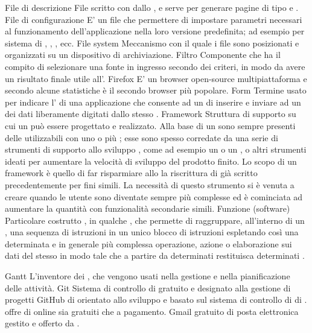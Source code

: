 \elemento
{File di descrizione}
{File scritto con   dallo , e serve per generare pagine di tipo e .}
\elemento
{File di configurazione}
{E' un file che permettere di impostare parametri necessari al funzionamento dell'applicazione nella loro versione predefinita; ad esempio  per sistema di , , , ecc.}
\elemento
{File system}
{Meccanismo con il quale i file sono posizionati e organizzati su un dispositivo di archiviazione.}
\elemento
{Filtro} 
{Componente che ha il compito di selezionare una fonte in ingresso secondo dei criteri, in modo da avere un risultato finale utile all'.}
\elemento
{Firefox}
{E' un browser open-source multipiattaforma e secondo alcune statistiche è il secondo browser più popolare.}
\elemento
{Form}
{Termine usato per indicare l' di una applicazione che consente ad un  di inserire e inviare ad un  dei dati liberamente digitati dallo stesso .}
\elemento
{Framework}
{Struttura di supporto su cui un  può essere progettato e realizzato. Alla base di un  sono sempre presenti delle  utilizzabili con uno o più ; esse sono spesso corredate da una serie di strumenti di supporto allo sviluppo , come ad esempio un  o un , o altri strumenti ideati per aumentare la velocità di sviluppo del prodotto finito.
Lo scopo di un framework è quello di far risparmiare allo la riscrittura di  già scritto precedentemente per fini simili. La necessità di questo strumento si è venuta a creare quando le  utente sono diventate sempre più complesse ed è cominciata ad aumentare la quantità  con funzionalità secondarie simili.}
\elemento
{Funzione (software)}
{Particolare costrutto , in qualche , che permette di raggruppare, all'interno di un , una sequenza di istruzioni in un unico blocco di istruzioni espletando così una determinata e in generale più complessa operazione, azione o elaborazione sui dati del  stesso in modo tale che a partire da determinati  restituisca determinati .}

\elemento
{Gantt} 
{L'inventore dei , che vengono usati nella gestione e nella pianificazione delle attività.}
\elemento
{Git} 
{Sistema di controllo di  gratuito e  designato alla gestione di progetti }
\elemento
{GitHub} 
{ di  orientato allo sviluppo  e basato sul sistema di controllo di  di .  offre  di  online sia gratuiti che a pagamento.}
\elemento
{Gmail} 
{ gratuito di posta elettronica gestito e offerto da .}

